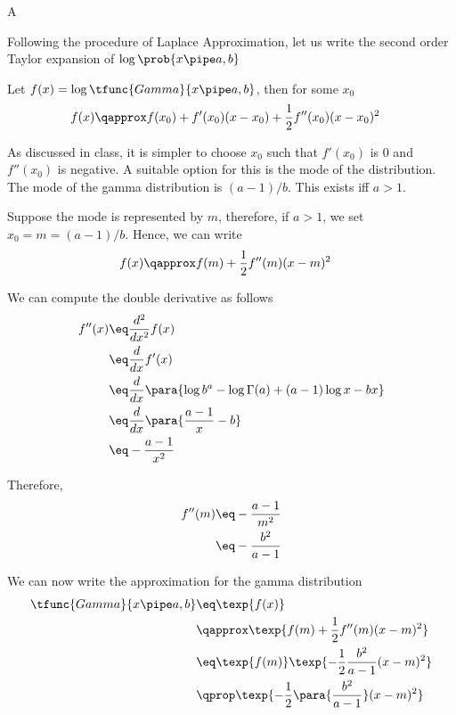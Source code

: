 \documentclass{article}
\begin{document}
\begin{question}

	\begin{qpart}{A}

		Following the procedure of Laplace Approximation, let us write the second order Taylor expansion of $\log{\prob{x \pipe a, b}}$

		Let $f(x) = \log{\tfunc{Gamma}{x \pipe a, b}}$, then for some $x_0$
		\begin{align*}
			f(x)	&\qapprox	f(x_0) + f'(x_0) (x - x_0) + \frac{1}{2} f''(x_0) (x - x_0)^2
		\end{align*}

		As discussed in class, it is simpler to choose $x_0$ such that $f'(x_0)$ is 0 and $f''(x_0)$ is negative. A suitable option for this is the mode of the distribution. The mode of the gamma distribution is $(a - 1) / b$. This exists iff $a > 1$.

		Suppose the mode is represented by $m$, therefore, if $a > 1$, we set $x_0 = m = (a - 1) / b$. Hence, we can write
		\begin{align*}
			f(x)	&\qapprox	f(m) + \frac{1}{2} f''(m) (x - m)^2
		\end{align*}

		We can compute the double derivative as follows
		\begin{align*}
			f''(x)	&\eq	\frac{d^2}{dx^2} f(x) \\
			&\eq	\frac{d}{dx} f'(x) \\
			&\eq	\frac{d}{dx} \para{\log{b^a} - \log{\Gamma(a)} + (a - 1) \log{x} - bx} \\
			&\eq	\frac{d}{dx} \para{\frac{a - 1}{x} - b} \\
			&\eq	- \frac{a - 1}{x^2}
		\end{align*}

		Therefore,
		\begin{align*}
			f''(m)	&\eq	- \frac{a - 1}{m^2} \\
			&\eq	- \frac{b^2}{a - 1}
		\end{align*}

		We can now write the approximation for the gamma distribution
		\begin{align*}
			\tfunc{Gamma}{x \pipe a, b}	&\eq	\texp{f(x)} \\
			&\qapprox	\texp{f(m) + \frac{1}{2} f''(m) (x - m)^2} \\
			&\eq	\texp{f(m)} \texp{- \frac{1}{2} \frac{b^2}{a - 1} (x - m)^2} \\
			&\qprop	\texp{- \frac{1}{2} \para{\frac{b^2}{a - 1}} (x - m)^2}
		\end{align*}


\end{qpart}
\end{question}
\end{document}
